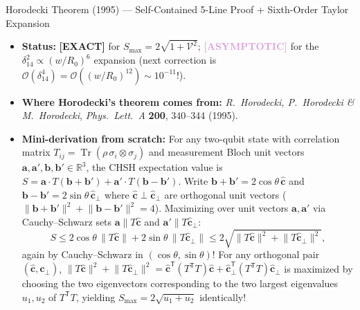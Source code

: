 \documentclass[10pt,letterpaper]{article}
\newcommand{\norm}[1]{\lVert #1 \rVert}
\newcommand{\tagexact}{\textcolor{forest}{\textbf{[EXACT]}}}
\newcommand{\tagasymp}{\textcolor{plum}{\textbf{[ASYMPTOTIC]}}}
\numberwithin{equation}{section}
\begin{document}
\begin{approxbox}{Horodecki Theorem (1995) --- Self-Contained 5-Line Proof + Sixth-Order Taylor Expansion}
\begin{itemize}[leftmargin=1.4em,itemsep=2pt,topsep=1pt]
  \item \textbf{Status:} \tagexact{} for $S_{\max} = 2\sqrt{1+\mathcal{V}^2}$; \tagasymp{} for the $\delta_{14}^2 \propto (w/R_0)^6$ expansion (next correction is $\mathcal{O}(\delta_{14}^4) = \mathcal{O}((w/R_0)^{12}) \sim 10^{-11}$!).
  \item \textbf{Where Horodecki's theorem comes from:} \emph{R.\ Horodecki, P.\ Horodecki \& M.\ Horodecki}, \emph{Phys.\ Lett.\ A} \textbf{200}, 340--344 (1995).
  \item \textbf{Mini-derivation from scratch:} For any two-qubit state with correlation matrix $T_{ij} = \operatorname{Tr}(\rho\,\sigma_i\otimes\sigma_j)$ and measurement Bloch unit vectors $\mathbf{a}, \mathbf{a}', \mathbf{b}, \mathbf{b}' \in \mathbb{R}^3$, the CHSH expectation value is $S = \mathbf{a}\cdot T(\mathbf{b}+\mathbf{b}') + \mathbf{a}'\cdot T(\mathbf{b}-\mathbf{b}')$. Write $\mathbf{b} + \mathbf{b}' = 2\cos\theta\,\hat{\mathbf{c}}$ and $\mathbf{b} - \mathbf{b}' = 2\sin\theta\,\hat{\mathbf{c}}_\perp$ where $\hat{\mathbf{c}} \perp \hat{\mathbf{c}}_\perp$ are orthogonal unit vectors ($\norm{\mathbf{b}+\mathbf{b}'}^2 + \norm{\mathbf{b}-\mathbf{b}'}^2 = 4$). Maximizing over unit vectors $\mathbf{a}, \mathbf{a}'$ via Cauchy--Schwarz sets $\mathbf{a} \parallel T\hat{\mathbf{c}}$ and $\mathbf{a}' \parallel T\hat{\mathbf{c}}_\perp$:
  \[
    S \le 2\cos\theta\,\norm{T\hat{\mathbf{c}}} + 2\sin\theta\,\norm{T\hat{\mathbf{c}}_\perp} \le 2\sqrt{\norm{T\hat{\mathbf{c}}}^2 + \norm{T\hat{\mathbf{c}}_\perp}^2},
  \]
  again by Cauchy--Schwarz in $(\cos\theta, \sin\theta)$! For any orthogonal pair $(\hat{\mathbf{c}}, \hat{\mathbf{c}}_\perp)$, $\norm{T\hat{\mathbf{c}}}^2 + \norm{T\hat{\mathbf{c}}_\perp}^2 = \hat{\mathbf{c}}^{\mathsf{T}}(T^{\mathsf{T}}T)\hat{\mathbf{c}} + \hat{\mathbf{c}}_\perp^{\mathsf{T}}(T^{\mathsf{T}}T)\hat{\mathbf{c}}_\perp$ is maximized by choosing the two eigenvectors corresponding to the two largest eigenvalues $u_1, u_2$ of $T^{\mathsf{T}}T$, yielding $S_{\max} = 2\sqrt{u_1 + u_2}$ identically!
\end{itemize}
\end{approxbox}
\end{document}

